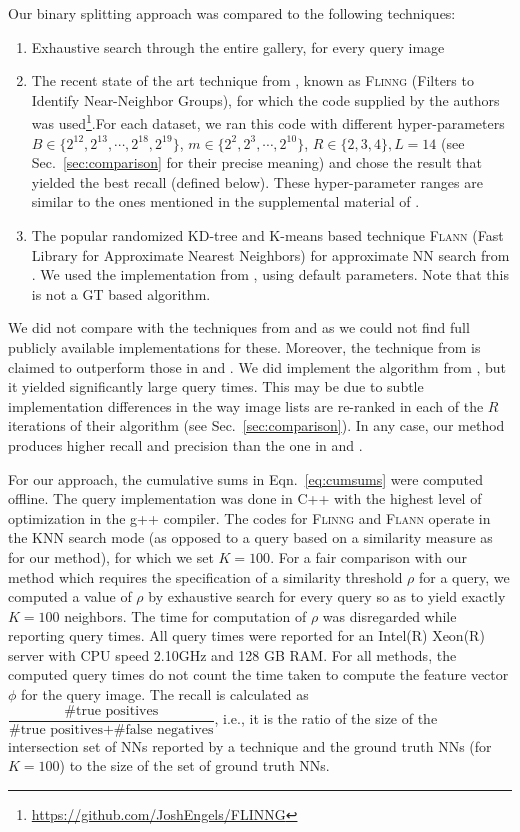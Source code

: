 \documentclass[sigconf, anonymous, review]{acmart}
\begin{document}
Our binary splitting approach was compared to the following techniques:
\begin{enumerate}
    \item Exhaustive search through the entire gallery, for every query image
    \item The recent state of the art technique from \cite{Engels2021}, known as \textsc{Flinng} (Filters to Identify Near-Neighbor Groups), for which the code supplied by the authors was used\footnote{\url{https://github.com/JoshEngels/FLINNG}}.For each dataset, we ran this code with different hyper-parameters $B \in \{2^{12}, 2^{13}, \cdots, 2^{18}, 2^{19}\}$, $m \in \{2^2,2^3,\cdots,2^{10}\}$, $R \in \{2, 3, 4\}, L = 14$ (see Sec.~\ref{sec:comparison} for their precise meaning) and chose the result that yielded the best recall (defined below). These hyper-parameter ranges are similar to the ones mentioned in the supplemental material of \cite{Engels2021}.
    \item The popular randomized KD-tree and K-means based technique \textsc{Flann} (Fast Library for Approximate Nearest Neighbors) for approximate NN search from \cite{Muja2014}. We used the implementation from \cite{FlannPy}, using default parameters. Note that this is not a GT based algorithm.
\end{enumerate}
We did not compare with the techniques from \cite{Shi2014} and \cite{Iscen2018} as we could not find full publicly available implementations for these. Moreover, the technique from \cite{Engels2021} is claimed to outperform those in \cite{Shi2014} and \cite{Iscen2018}. We did implement the algorithm from \cite{Shi2014}, but it yielded significantly large query times. This may be due to subtle implementation differences in the way image lists are re-ranked in each of the $R$ iterations of their algorithm (see Sec.~\ref{sec:comparison}). In any case, our method produces higher recall and precision than the one in \cite{Shi2014} and \cite{Iscen2018}.

For our approach, the cumulative sums in Eqn.~\ref{eq:cumsums} were computed offline. The query implementation was done in C++ with the highest level of optimization in the g++ compiler. The codes for \textsc{Flinng} and \textsc{Flann} operate in the KNN search mode (as opposed to a query based on a similarity measure as for our method), for which we set $K = 100$. For a fair comparison with our method which requires the specification of a similarity threshold $\rho$ for a query, we computed a value of $\rho$ by exhaustive search for every query so as to yield exactly $K=100$ neighbors. The time for computation of $\rho$ was disregarded while reporting query times. All query times were reported for an Intel(R) Xeon(R) server with CPU speed 2.10GHz and 128 GB RAM. For all methods, the computed query times do not count the time taken to compute the feature vector $\phi$ for the query image. The recall is calculated as $\dfrac{\textrm{\#true positives}}{\textrm{\#true positives} + \textrm{\#false negatives}}$, i.e., it is the ratio of the size of the intersection set of NNs reported by a technique and the ground truth NNs (for $K = 100$) to the size of the set of ground truth NNs. 
\end{document}
